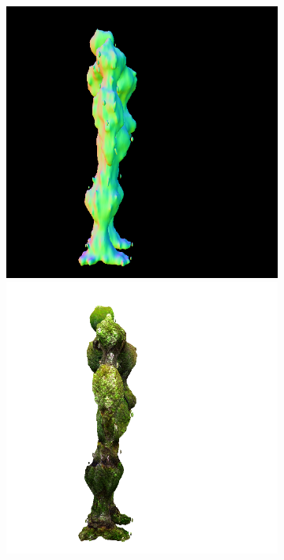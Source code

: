 \begin{figure}[ht]
\begin{subfigure}[b]{0.222\textwidth}
        \caption{}
    \end{subfigure}
    \begin{subfigure}[b]{0.222\textwidth}
        \centering
        \fontsize{9pt}{7pt}\selectfont{}\vspace{.1cm}
        \includegraphics[width=\textwidth]{etc/a robot made out of plants/magic123/magic123_refine_robot_right_5000_part2.png}
        \includegraphics[width=\textwidth]{etc/a robot made out of plants/magic123/magic123_refine_robot_right_5000_part1.png}

\end{subfigure}
\end{figure}
